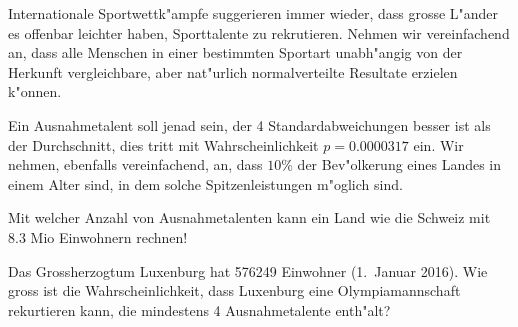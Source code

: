 Internationale Sportwettk"ampfe suggerieren immer wieder, dass grosse
L"ander es offenbar leichter haben, Sporttalente zu rekrutieren.
Nehmen wir vereinfachend an, dass alle Menschen in einer
bestimmten Sportart unabh"angig von der Herkunft vergleichbare,
aber nat"urlich normalverteilte Resultate erzielen k"onnen.

Ein Ausnahmetalent soll jenad sein, der 4 Standardabweichungen besser ist
als der Durchschnitt, dies tritt mit Wahrscheinlichkeit $p = 0.0000317$ ein.
Wir nehmen, ebenfalls vereinfachend, an, dass $10\%$ der Bev"olkerung
eines Landes in einem Alter sind, in dem solche Spitzenleistungen
m"oglich sind.
\begin{teilaufgaben}
\item
Mit welcher Anzahl von Ausnahmetalenten kann ein Land wie die Schweiz mit 
8.3 Mio Einwohnern rechnen!
\item
Das Grossherzogtum Luxenburg hat 576249 Einwohner (1.~Januar 2016).
Wie gross ist die Wahrscheinlichkeit, dass Luxenburg eine Olympiamannschaft
rekurtieren kann, die mindestens 4 Ausnahmetalente enth"alt?
\end{teilaufgaben}


\begin{bewertung}
\end{bewertung}

